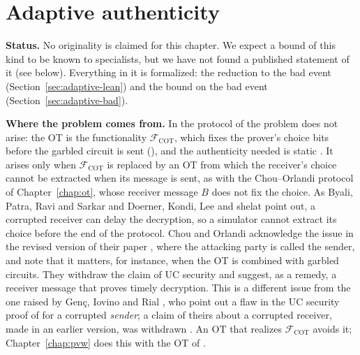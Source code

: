 \chapter{Adaptive authenticity}
\label{chap:adaptive}

\textbf{Status.} No originality is claimed for this chapter. We expect a bound of this kind to be
known to specialists, but we have not found a published statement of it (see below). Everything in it is
formalized: the reduction to the bad event (Section~\ref{sec:adaptive-lean}) and the bound on
the bad event (Section~\ref{sec:adaptive-bad}).

\textbf{Where the problem comes from.} In the protocol of \cite{JKO13} the problem does not
arise: the OT is the functionality $\mathcal{F}_{\mathrm{COT}}$, which fixes the prover's choice bits
before the garbled circuit is sent (\cite[Fig.~3 and Fig.~6]{JKO13}), and the authenticity needed
is static \cite[Definition~2]{JKO13}. It arises only when $\mathcal{F}_{\mathrm{COT}}$ is replaced by
an OT from which the receiver's choice cannot be extracted when its message is sent, as with the
Chou--Orlandi protocol of Chapter~\ref{chap:ot}, whose receiver message $B$ does not fix the
choice. As Byali, Patra, Ravi and Sarkar \cite[Sect.~3]{BPRS17} and Doerner, Kondi, Lee and shelat
\cite[App.~A]{DKLs18} point out, a corrupted receiver can delay the decryption, so a simulator
cannot extract its choice before the end of the protocol. Chou and Orlandi acknowledge the issue in
the revised version of their paper \cite[Sect.~1.1]{CO15}, where the attacking party is called the
sender, and note that it matters, for instance, when the OT is combined with garbled circuits. They
withdraw the claim of UC security and suggest, as a
remedy, a receiver message that proves timely decryption. This is a different issue from the one raised by Genç, Iovino and Rial \cite{GIR}, who
point out a flaw in the UC security proof of \cite{CO15} for a corrupted \emph{sender}; a claim of
theirs about a corrupted receiver, made in an earlier version, was withdrawn \cite[Sect.~1]{GIR}. An OT that realizes $\mathcal{F}_{\mathrm{COT}}$ avoids
it; Chapter~\ref{chap:pvw} does this with the OT of \cite{PVW08}.

